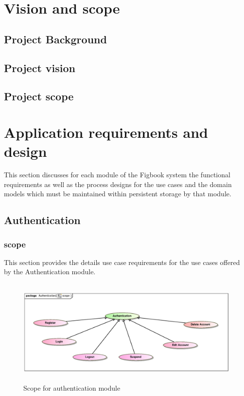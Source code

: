 \documentclass[12pt]{article}
\begin{document}


\newpage
\tableofcontents

\newpage
\listoffigures

\newpage

\section{Vision and scope}

\subsection{Project Background}

\subsection{Project vision}

\subsection{Project scope}

\section{Application requirements and design}
\par{This section discusses for each module of the Figbook system the functional requirements
as well as the process designs for the use cases and the domain models which must be maintained
within persistent storage by that module.
}

\subsection{Authentication}

\subsubsection{scope}
\par{This section provides the details use case requirements for the use cases offered by the Authentication
module.}
\begin{figure}[h]
	\includegraphics[height=200px, width=500px]{epsImages/Authentication/AuthenticationScope.eps}
	\caption{Scope for authentication module}
\end{figure}
\end{document}
